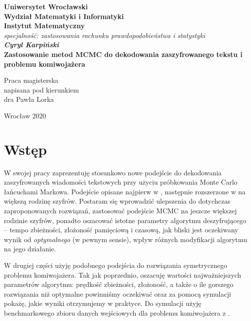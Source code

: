 \documentclass[a4paper]{article}
\begin{document}
\newpage
\thispagestyle{empty}
\begin{center}
\textbf{\large Uniwersytet Wrocławski\\
Wydział Matematyki i Informatyki\\
Instytut Matematyczny}\\
\textit{\large specjalność: zastosowania rachunku prawdopodobieństwa i statystyki}\\
\vspace{4cm}
\textbf{\textit{\large Cyryl Karpiński}\\
\vspace{0.5cm}
{\Large Zastosowanie metod MCMC do dekodowania zaszyfrowanego tekstu
i problemu komiwojażera}}\\
\end{center}
\vspace{3cm}
{\large \hspace*{6.5cm}Praca magisterska\\
\hspace*{6.5cm}napisana pod kierunkiem\\
\hspace*{6.5cm}dra Pawła Lorka}\\
\vfill
\begin{center}
{\large Wrocław 2020}\\
\end{center}

\newpage
\tableofcontents
\newpage
\section{Wstęp}
W swojej pracy zaprezentuję stosunkowo nowe podejście do dekodowania zaszyfrowanych wiadomości tekstowych przy użyciu próbkowania Monte Carlo łańcuchami Markowa. Podejście opisane najpierw w  \cite{Connor}, następnie rozszerzone w \cite{Chen&Rosenthal} na większą rodzinę szyfrów. Postaram się wprowadzić ulepszenia do dotychczas zaproponowanych rozwiązań, zastosować podejście MCMC na jeszcze większej rodzinie szyfrów, ponadto oszacować istotne parametry algorytmu deszyfrującego – tempo zbieżności, złożoność pamięciową i czasową, jak bliski jest oczekiwany wynik od \textit{optymalnego} (w pewnym sensie), wpływ różnych modyfikacji algorytmu na jego działanie.

W drugiej części użyję podobnego podejścia do rozwiązania symetrycznego problemu komiwojażera. Tak jak poprzednio, oszacuję wartości najważniejszych parametrów algorytmu: prędkość zbieżności, złożoność, a także o ile gorszego rozwiązania niż optymalne powinniśmy oczekiwać oraz za pomocą symulacji pokażę, jakie wyniki otrzymujemy w praktyce. Do symulacji użyję benchmarkowego zbioru danych wejściowych dla problemu komiwojażera z \cite{benchmark}.\\
\end{document}
